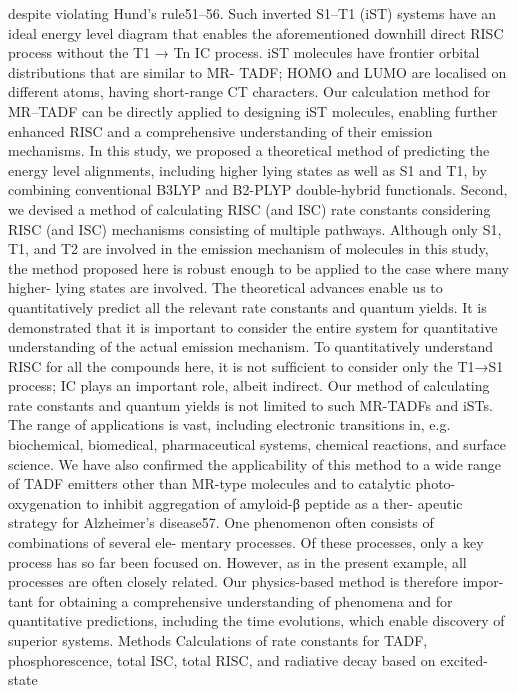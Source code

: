 despite violating Hund’s rule51–56. Such inverted S1–T1 (iST) systems
have an ideal energy level diagram that enables the aforementioned
downhill direct RISC process without the T1 → Tn IC process. iST
molecules have frontier orbital distributions that are similar to MR-
TADF; HOMO and LUMO are localised on different atoms, having
short-range CT characters. Our calculation method for MR–TADF can
be directly applied to designing iST molecules, enabling further
enhanced RISC and a comprehensive understanding of their emission
mechanisms.
In this study, we proposed a theoretical method of predicting the
energy level alignments, including higher lying states as well as S1 and
T1, by combining conventional B3LYP and B2-PLYP double-hybrid
functionals. Second, we devised a method of calculating RISC (and ISC)
rate constants considering RISC (and ISC) mechanisms consisting of
multiple pathways. Although only S1, T1, and T2 are involved in the
emission mechanism of molecules in this study, the method proposed
here is robust enough to be applied to the case where many higher-
lying states are involved. The theoretical advances enable us to
quantitatively predict all the relevant rate constants and quantum
yields. It is demonstrated that it is important to consider the entire
system
for quantitative
understanding
of the
actual emission
mechanism. To quantitatively understand RISC for all the compounds
here, it is not sufﬁcient to consider only the T1→S1 process; IC plays an
important role, albeit indirect.
Our method of calculating rate constants and quantum yields is
not limited to such MR-TADFs and iSTs. The range of applications is
vast, including electronic transitions in, e.g. biochemical, biomedical,
pharmaceutical systems, chemical reactions, and surface science. We
have also conﬁrmed the applicability of this method to a wide range of
TADF emitters other than MR-type molecules and to catalytic photo-
oxygenation to inhibit aggregation of amyloid-β peptide as a ther-
apeutic strategy for Alzheimer’s disease57.
One phenomenon often consists of combinations of several ele-
mentary processes. Of these processes, only a key process has so far
been focused on. However, as in the present example, all processes are
often closely related. Our physics-based method is therefore impor-
tant for obtaining a comprehensive understanding of phenomena and
for quantitative predictions, including the time evolutions, which
enable discovery of superior systems.
Methods
Calculations of rate constants for TADF, phosphorescence, total
ISC, total RISC, and radiative decay based on excited-state
